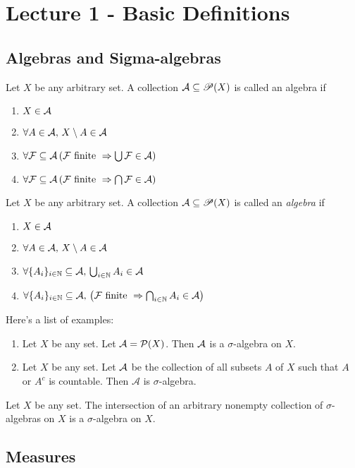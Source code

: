 \section{Lecture 1 - Basic Definitions}
\subsection{Algebras and Sigma-algebras}
\begin{definition}[Algebra]
Let $X$ be any arbitrary set. A collection ${\cal A} \subseteq \mathscr P (X)$ is called an algebra if 
\begin{enumerate}
    \item $X\in {\cal A}$
    \item $\forall A \in {\cal A},\, X\setminus A \in {\cal A}$
    \item $\forall {\cal F} \subseteq {\cal A} \left( {\cal F} \text{ finite } \Rightarrow \bigcup {\cal F} \in {\cal A} \right)$
    \item $\forall {\cal F} \subseteq {\cal A} \left( {\cal F} \text{ finite } \Rightarrow \bigcap {\cal F} \in {\cal A} \right)$
\end{enumerate}
\end{definition}

\begin{definition}
Let $X$ be any arbitrary set. A collection ${\cal A} \subseteq \mathscr P (X)$ is called an \textit{algebra} if 
\begin{enumerate}
    \item $X\in {\cal A}$
    \item $\forall A \in {\cal A},\, X\setminus A \in {\cal A}$
    \item $\forall \{ A_i \}_{i\in\mathbb N} \subseteq \mathcal{A}, \,  \bigcup_{i\in \mathbb N} A_i  \in {\cal A} $
    \item $\forall \{ A_i \}_{i\in\mathbb N} \subseteq \mathcal{A},\, \left( {\cal F} \text{ finite } \Rightarrow \bigcap_{i\in\mathbb N} A_i\in {\cal A} \right)$
\end{enumerate}
\end{definition}

\begin{example} Here's a list of examples:
\begin{enumerate}
    \item Let $X$ be any set. Let ${\cal A} ={\cal P} (X)$. Then ${\cal A}$ is a $\sigma$-algebra on $X$.
    \item Let $X$ be any set. Let ${\cal A}$ be the collection of all subsets $A$ of $X$ such that $A$ or $A^c$ is countable. Then $\mathcal{A}$ is $\sigma$-algebra.
\end{enumerate}
\end{example}

\begin{proposition}
Let $X$ be any set. The intersection of an arbitrary nonempty collection of $\sigma$-algebras on $X$ is a $\sigma$-algebra on $X$.
\end{proposition}


\subsection{Measures}
\begin{example}

\end{example}